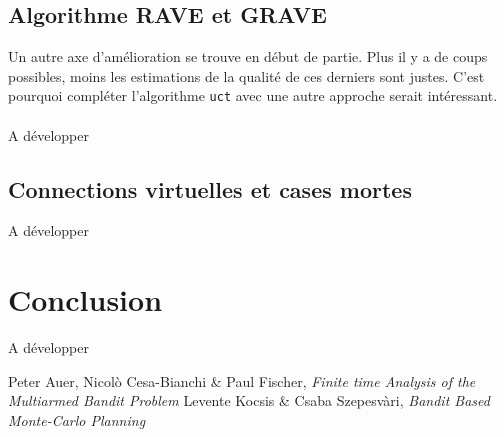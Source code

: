 \documentclass[a4paper]{article}
\theoremstyle{definition}
\begin{document}
\subsection{Algorithme RAVE et GRAVE}

Un autre axe d'amélioration se trouve en début de partie. Plus il y a de coups possibles, moins les estimations de la qualité de ces derniers sont justes. C'est pourquoi compléter l'algorithme \texttt{uct} avec une autre approche serait intéressant.\\
\\
A développer

\subsection{Connections virtuelles et cases mortes}

A développer
\newpage

\section{Conclusion}

A développer

\newpage

\listoffigures 

\newpage

%
\begin{thebibliography}{9}

Peter Auer, Nicol\`o Cesa-Bianchi \& Paul Fischer, {\em Finite time Analysis of the Multiarmed Bandit Problem}
Levente Kocsis \& Csaba Szepesv\`ari, {\em Bandit Based Monte-Carlo Planning}

\end{thebibliography}
\end{document}

